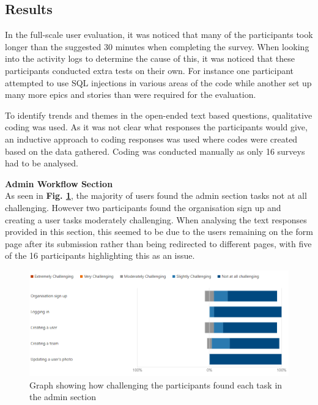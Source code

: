 \documentclass[l4proj.tex]{subfiles}
\begin{document}
\subsection{Results}
In the full-scale user evaluation, it was noticed that many of the participants took longer than the suggested 30 minutes when completing the survey. When looking into the activity logs to determine the cause of this, it was noticed that these participants conducted extra tests on their own. For instance one participant attempted to use SQL injections in various areas of the code while another set up many more epics and stories than were required for the evaluation. 

To identify trends and themes in the open-ended text based questions, qualitative coding was used. As it was not clear what responses the participants would give, an inductive approach to coding responses was used where codes were created based on the data gathered. Coding was conducted manually as only 16 surveys had to be analysed.

\textbf{Admin Workflow Section}\\
As seen in \textbf{Fig. \ref{fig:admin task graph}}, the majority of users found the admin section tasks not at all challenging. However two participants found the organisation sign up and creating a user tasks moderately challenging. When analysing the text responses provided in this section, this seemed to be due to the users remaining on the form page after its submission rather than being redirected to different pages, with five of the 16 participants highlighting this as an issue.

\begin{figure}[h!]
\begin{center}
\includegraphics[scale=0.5]{dissertation/images/EvaluationAdminChallengingGraph.png}
\caption{Graph showing how challenging the participants found each task in the admin section}
\label{fig:admin task graph} 
\end{center}
\end{figure}
\end{document}
